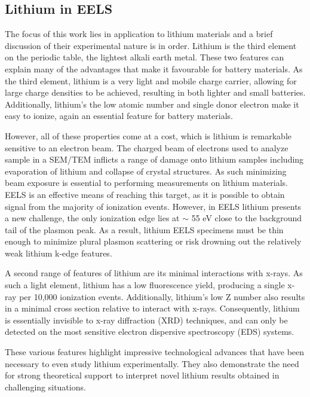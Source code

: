 \subsection{Lithium in EELS}
The focus of this work lies in application to lithium materials and a brief discussion of their experimental nature is in order.  Lithium is the third element on the periodic table, the lightest alkali earth metal.  These two features can explain many of the advantages that make it favourable for battery materials.  As the third element, lithium is a very light and mobile charge carrier, allowing for large charge densities to be achieved, resulting in both lighter and small batteries.  Additionally, lithium's the low atomic number and single donor electron make it easy to ionize, again an essential feature for battery materials.  

However, all of these properties come at a cost, which is lithium is remarkable sensitive to an electron beam.  The charged beam of electrons used to analyze sample in a SEM/TEM inflicts a range of damage onto lithium samples including evaporation of lithium and collapse of crystal structures.  As such minimizing beam exposure is essential to performing measurements on lithium materials.  EELS is an effective means of reaching this target, as it is possible to obtain signal from the majority of ionization events.  However, in EELS lithium presents a new challenge, the only ionization edge lies at $\sim$ 55 eV close to the background tail of the plasmon peak.  As a result, lithium EELS specimens must be thin enough to minimize plural plasmon scattering or risk drowning out the relatively weak  lithium k-edge features.  

A second range of features of lithium are its minimal interactions with x-rays.  As such a light element, lithium has a low fluorescence yield, producing a single x-ray per 10,000 ionization events.  Additionally, lithium's low Z number also results in a minimal cross section relative to interact with x-rays.  Consequently, lithium is essentially invisible to x-ray diffraction (XRD) techniques, and can only be detected on the most sensitive electron dispersive spectroscopy (EDS) systems.

These various features highlight impressive technological advances that have been necessary to even study lithium experimentally.  They also demonstrate the need for strong theoretical support to interpret novel lithium results obtained in challenging situations.  




